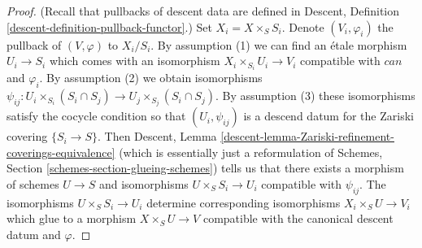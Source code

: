 \documentclass[10pt,a4paper]{amsart}
\theoremstyle{plain}
\theoremstyle{definition}
\theoremstyle{remark}
\numberwithin{equation}{subsection}
\begin{document}
\begin{proof}
(Recall that pullbacks of descent data are defined in
Descent, Definition \ref{descent-definition-pullback-functor}.)
Set $X_i = X \times_S S_i$. Denote $(V_i, \varphi_i)$ the pullback
of $(V, \varphi)$ to $X_i/S_i$.
By assumption (1) we can find an \'etale morphism $U_i \to S_i$
which comes with an isomorphism $X_i \times_{S_i} U_i \to V_i$ compatible with
$can$ and $\varphi_i$. By assumption (2) we obtain isomorphisms
$\psi_{ij} : U_i \times_{S_i} (S_i \cap S_j) \to
U_j \times_{S_j} (S_i \cap S_j)$.
By assumption (3) these isomorphisms satisfy the cocycle condition
so that $(U_i, \psi_{ij})$ is a descend datum for the
Zariski covering $\{S_i \to S\}$. Then Descent, Lemma
\ref{descent-lemma-Zariski-refinement-coverings-equivalence}
(which is essentially just a reformulation of
Schemes, Section \ref{schemes-section-glueing-schemes})
tells us that there exists a morphism of schemes $U \to S$
and isomorphisms $U \times_S S_i \to U_i$ compatible
with $\psi_{ij}$. The isomorphisms $U \times_S S_i \to U_i$
determine corresponding isomorphisms $X_i \times_S U \to V_i$
which glue to a morphism $X \times_S U \to V$ compatible
with the canonical descent datum and $\varphi$.
\end{proof}
\end{document}
